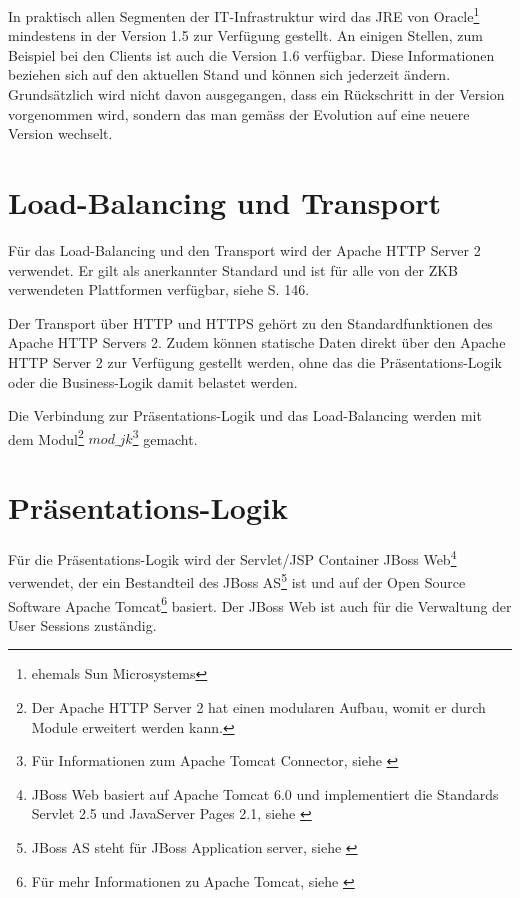   In praktisch allen Segmenten der IT-Infrastruktur wird das \ac{JRE}
  von Oracle\footnote{ehemals Sun Microsystems} mindestens in der Version 1.5
  zur Verfügung gestellt. An einigen Stellen, zum Beispiel bei den Clients ist
  auch die Version 1.6 verfügbar. Diese Informationen beziehen sich auf den
  aktuellen Stand und können sich jederzeit ändern. Grundsätzlich wird nicht
  davon ausgegangen, dass ein Rückschritt in der Version vorgenommen wird,
  sondern das man gemäss der Evolution auf eine neuere Version wechselt.
  
  \section{Load-Balancing und Transport}
  
  Für das Load-Balancing und den Transport wird der Apache HTTP Server 2
  verwendet. Er gilt als anerkannter Standard und ist für alle von der \ac{ZKB}
  verwendeten Plattformen verfügbar, siehe \cite{ZkbHandbuchDerItArchitektur}
  S. 146.
  
  Der Transport über \ac{HTTP} und \ac{HTTPS} gehört zu den Standardfunktionen
  des Apache HTTP Servers 2. Zudem können statische Daten direkt über den
  Apache HTTP Server 2 zur Verfügung gestellt werden, ohne das die
  Präsentations-Logik oder die Business-Logik damit belastet werden.
  
  Die Verbindung zur Präsentations-Logik und das Load-Balancing werden mit
  dem Modul\footnote{Der Apache HTTP Server 2 hat einen modularen Aufbau, womit
  er durch Module erweitert werden kann.} \(mod\_jk\)\footnote{Für
  Informationen zum Apache Tomcat Connector, siehe \cite{ModJk}} gemacht.
  
  \section{Präsentations-Logik}
  
  Für die Präsentations-Logik wird der Servlet/JSP Container JBoss
  Web\footnote{JBoss Web basiert auf Apache Tomcat 6.0 und implementiert die
  Standards Servlet 2.5 und JavaServer Pages 2.1, siehe \cite{JBossWeb}}
  verwendet, der ein Bestandteil des JBoss AS\footnote{JBoss AS steht für JBoss
  Application server, siehe \cite{JBossAS}} ist und auf der Open Source Software
  Apache Tomcat\footnote{Für mehr Informationen zu Apache Tomcat, siehe
  \cite{ApacheTomcat}} basiert. Der JBoss Web ist auch für die Verwaltung der
  User Sessions zuständig.
  
